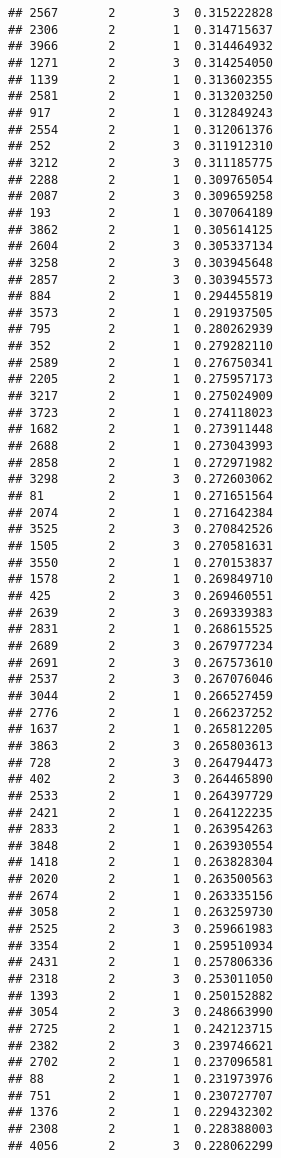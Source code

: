 \documentclass[
]{article}
\begin{document}
\begin{verbatim}
## 2567       2        3  0.315222828
## 2306       2        1  0.314715637
## 3966       2        1  0.314464932
## 1271       2        3  0.314254050
## 1139       2        1  0.313602355
## 2581       2        1  0.313203250
## 917        2        1  0.312849243
## 2554       2        1  0.312061376
## 252        2        3  0.311912310
## 3212       2        3  0.311185775
## 2288       2        1  0.309765054
## 2087       2        3  0.309659258
## 193        2        1  0.307064189
## 3862       2        1  0.305614125
## 2604       2        3  0.305337134
## 3258       2        3  0.303945648
## 2857       2        3  0.303945573
## 884        2        1  0.294455819
## 3573       2        1  0.291937505
## 795        2        1  0.280262939
## 352        2        1  0.279282110
## 2589       2        1  0.276750341
## 2205       2        1  0.275957173
## 3217       2        1  0.275024909
## 3723       2        1  0.274118023
## 1682       2        1  0.273911448
## 2688       2        1  0.273043993
## 2858       2        1  0.272971982
## 3298       2        3  0.272603062
## 81         2        1  0.271651564
## 2074       2        1  0.271642384
## 3525       2        3  0.270842526
## 1505       2        3  0.270581631
## 3550       2        1  0.270153837
## 1578       2        1  0.269849710
## 425        2        3  0.269460551
## 2639       2        3  0.269339383
## 2831       2        1  0.268615525
## 2689       2        3  0.267977234
## 2691       2        3  0.267573610
## 2537       2        3  0.267076046
## 3044       2        1  0.266527459
## 2776       2        1  0.266237252
## 1637       2        1  0.265812205
## 3863       2        3  0.265803613
## 728        2        3  0.264794473
## 402        2        3  0.264465890
## 2533       2        1  0.264397729
## 2421       2        1  0.264122235
## 2833       2        1  0.263954263
## 3848       2        1  0.263930554
## 1418       2        1  0.263828304
## 2020       2        1  0.263500563
## 2674       2        1  0.263335156
## 3058       2        1  0.263259730
## 2525       2        3  0.259661983
## 3354       2        1  0.259510934
## 2431       2        1  0.257806336
## 2318       2        3  0.253011050
## 1393       2        1  0.250152882
## 3054       2        3  0.248663990
## 2725       2        1  0.242123715
## 2382       2        3  0.239746621
## 2702       2        1  0.237096581
## 88         2        1  0.231973976
## 751        2        1  0.230727707
## 1376       2        1  0.229432302
## 2308       2        1  0.228388003
## 4056       2        3  0.228062299

\end{verbatim}
\end{document}
